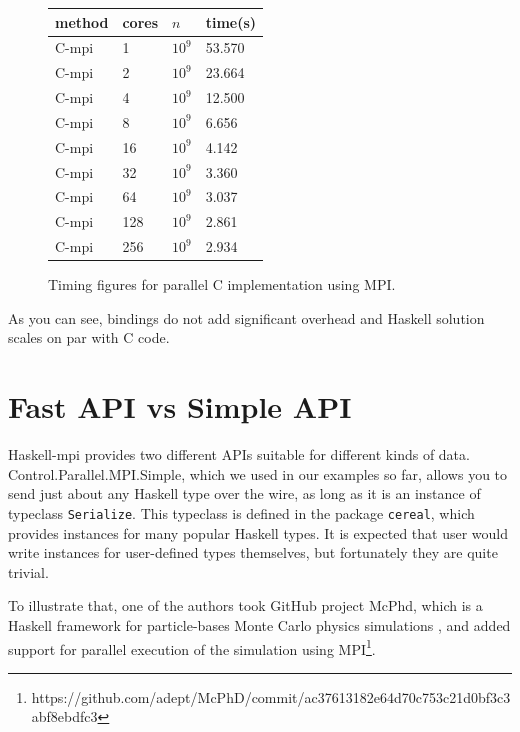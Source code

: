 \documentclass{tmr}
\begin{document}
\begin{figure}
\begin{center}
\begin{tabular}{|l|l|l|l|} \hline
method & cores & $n$ & time(s) \\ \hline\hline
C-mpi & 1   & $10^9$ & 53.570 \\ \hline
C-mpi & 2   & $10^9$ & 23.664  \\ \hline
C-mpi & 4   & $10^9$ & 12.500 \\ \hline
C-mpi & 8   & $10^9$ & 6.656 \\ \hline
C-mpi & 16  & $10^9$ & 4.142 \\ \hline
C-mpi & 32 & $10^9$ & 3.360 \\ \hline
C-mpi & 64   & $10^9$ & 3.037 \\ \hline
C-mpi & 128   & $10^9$ & 2.861 \\ \hline
C-mpi & 256 & $10^9$ & 2.934 \\ \hline
\end{tabular}
\end{center}
\caption{Timing figures for parallel C implementation using MPI.\label{CTiminigTable}}
\end{figure}

As you can see, bindings do not add significant overhead and Haskell
solution scales on par with C code.

\section{Fast API vs Simple API}

Haskell-mpi provides two different APIs suitable for different kinds
of data. Control.Parallel.MPI.Simple, which we used in our examples so
far, allows you to send just about any Haskell type over the wire, as
long as it is an instance of typeclass \verb|Serialize|. This
typeclass is defined in the package \verb|cereal|, which provides
instances for many popular Haskell types. It is expected that user
would write instances for user-defined types themselves, but
fortunately they are quite trivial.

To illustrate that, one of the authors took GitHub project McPhd,
which is a Haskell framework for particle-bases Monte Carlo physics
simulations , and added support for parallel execution of the
simulation using
MPI\footnote{https://github.com/adept/McPhD/commit/ac37613182e64d70c753c21d0bf3c3abf8ebdfc3}.
\end{document}

